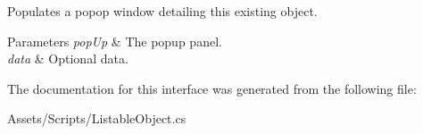 Populates a popop window detailing this existing object. 


\begin{DoxyParams}{Parameters}
{\em pop\+Up} & The popup panel.\\
\hline
{\em data} & Optional data.\\
\hline
\end{DoxyParams}


The documentation for this interface was generated from the following file\+:\begin{DoxyCompactItemize}
\item 
Assets/\+Scripts/Listable\+Object.\+cs\end{DoxyCompactItemize}
